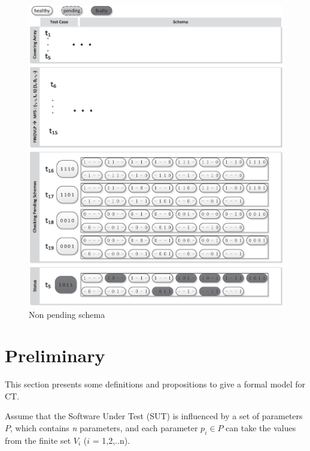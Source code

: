 \begin{figure}[!htb]
 \centering
 \includegraphics[width=5.3in]{non-pending.eps}
 \caption{Non pending schema}
 \label{fig_no_pending}
\end{figure}


\section{Preliminary}\label{sec:back}
This section presents some definitions and propositions to give a formal model for CT.


Assume that the Software Under Test (SUT) is influenced by a set of parameters $P$, which contains \emph{n} parameters, and each parameter $p_{i} \in P$ can take the values from the finite set $V_{i}$ ($i$ = 1,2,..n).

\newtheorem{assumption}{Assumption}


